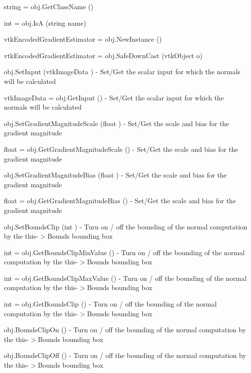 \begin{DoxyItemize}
\item {\ttfamily string = obj.\-Get\-Class\-Name ()}  
\item {\ttfamily int = obj.\-Is\-A (string name)}  
\item {\ttfamily vtk\-Encoded\-Gradient\-Estimator = obj.\-New\-Instance ()}  
\item {\ttfamily vtk\-Encoded\-Gradient\-Estimator = obj.\-Safe\-Down\-Cast (vtk\-Object o)}  
\item {\ttfamily obj.\-Set\-Input (vtk\-Image\-Data )} -\/ Set/\-Get the scalar input for which the normals will be calculated  
\item {\ttfamily vtk\-Image\-Data = obj.\-Get\-Input ()} -\/ Set/\-Get the scalar input for which the normals will be calculated  
\item {\ttfamily obj.\-Set\-Gradient\-Magnitude\-Scale (float )} -\/ Set/\-Get the scale and bias for the gradient magnitude  
\item {\ttfamily float = obj.\-Get\-Gradient\-Magnitude\-Scale ()} -\/ Set/\-Get the scale and bias for the gradient magnitude  
\item {\ttfamily obj.\-Set\-Gradient\-Magnitude\-Bias (float )} -\/ Set/\-Get the scale and bias for the gradient magnitude  
\item {\ttfamily float = obj.\-Get\-Gradient\-Magnitude\-Bias ()} -\/ Set/\-Get the scale and bias for the gradient magnitude  
\item {\ttfamily obj.\-Set\-Bounds\-Clip (int )} -\/ Turn on / off the bounding of the normal computation by the this-\/$>$Bounds bounding box  
\item {\ttfamily int = obj.\-Get\-Bounds\-Clip\-Min\-Value ()} -\/ Turn on / off the bounding of the normal computation by the this-\/$>$Bounds bounding box  
\item {\ttfamily int = obj.\-Get\-Bounds\-Clip\-Max\-Value ()} -\/ Turn on / off the bounding of the normal computation by the this-\/$>$Bounds bounding box  
\item {\ttfamily int = obj.\-Get\-Bounds\-Clip ()} -\/ Turn on / off the bounding of the normal computation by the this-\/$>$Bounds bounding box  
\item {\ttfamily obj.\-Bounds\-Clip\-On ()} -\/ Turn on / off the bounding of the normal computation by the this-\/$>$Bounds bounding box  
\item {\ttfamily obj.\-Bounds\-Clip\-Off ()} -\/ Turn on / off the bounding of the normal computation by the this-\/$>$Bounds bounding box  

\end{DoxyItemize}
